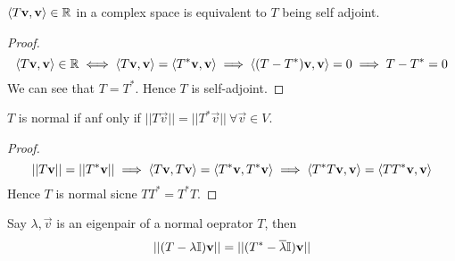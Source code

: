 \begin{corollary}
	$\langle T \mathbf v, \mathbf v \rangle \in \mathbb R$ in a complex space is equivalent to $T$ being self adjoint.
\end{corollary}
\begin{proof}
	\[ \langle T \mathbf v, \mathbf v \rangle \in \mathbb R \iff \langle T\mathbf v, \mathbf v\rangle = \langle T^*\mathbf v, \mathbf v \rangle \implies \langle (T - T^*)\mathbf v, \mathbf v\rangle = 0 \implies T - T^* = 0\]
	We can see that $T = T^*$. Hence $T$ is self-adjoint.
\end{proof}

\begin{theorem}
	$T$ is normal if anf only if $||T\vec v|| = ||T^* \vec v|| \ \forall \vec v \in V$.
\end{theorem}
\begin{proof}
	\[ ||T\mathbf v|| = ||T^* \mathbf v|| \implies \langle T\mathbf v, T\mathbf v\rangle = \langle T^* \mathbf v, T^* \mathbf v \rangle \implies \langle T^* T \mathbf v, \mathbf v \rangle = \langle TT^* \mathbf v, \mathbf v \rangle\]
	Hence $T$ is normal sicne $TT^* = T^*T$.
\end{proof}
\begin{theorem}
	Say $\lambda, \vec v$ is an eigenpair of a normal oeprator $T$, then 
	\[ ||(T - \lambda \mathbb I) \mathbf v ||=||(T^* - \overline \lambda \mathbb I)\mathbf v||\]
\end{theorem}

